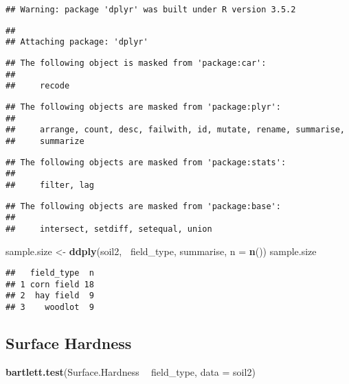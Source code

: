 \documentclass[]{article}
\newenvironment{Shaded}{\begin{snugshade}}{\end{snugshade}}
\newcommand{\KeywordTok}[1]{\textcolor[rgb]{0.13,0.29,0.53}{\textbf{#1}}}
\newcommand{\DataTypeTok}[1]{\textcolor[rgb]{0.13,0.29,0.53}{#1}}
\newcommand{\StringTok}[1]{\textcolor[rgb]{0.31,0.60,0.02}{#1}}
\newcommand{\OperatorTok}[1]{\textcolor[rgb]{0.81,0.36,0.00}{\textbf{#1}}}
\newcommand{\NormalTok}[1]{#1}
\begin{document}
\begin{verbatim}
## Warning: package 'dplyr' was built under R version 3.5.2
\end{verbatim}

\begin{verbatim}
## 
## Attaching package: 'dplyr'
\end{verbatim}

\begin{verbatim}
## The following object is masked from 'package:car':
## 
##     recode
\end{verbatim}

\begin{verbatim}
## The following objects are masked from 'package:plyr':
## 
##     arrange, count, desc, failwith, id, mutate, rename, summarise,
##     summarize
\end{verbatim}

\begin{verbatim}
## The following objects are masked from 'package:stats':
## 
##     filter, lag
\end{verbatim}

\begin{verbatim}
## The following objects are masked from 'package:base':
## 
##     intersect, setdiff, setequal, union
\end{verbatim}

\begin{Shaded}
\begin{Highlighting}[]
\NormalTok{sample.size <-}\StringTok{ }\KeywordTok{ddply}\NormalTok{(soil2, }\OperatorTok{~}\NormalTok{field_type, summarise, }\DataTypeTok{n =} \KeywordTok{n}\NormalTok{())}
\NormalTok{sample.size}
\end{Highlighting}
\end{Shaded}

\begin{verbatim}
##   field_type  n
## 1 corn field 18
## 2  hay field  9
## 3    woodlot  9
\end{verbatim}

\subsection{Surface Hardness}\label{surface-hardness}

\begin{Shaded}
\begin{Highlighting}[]
\KeywordTok{bartlett.test}\NormalTok{(Surface.Hardness }\OperatorTok{~}\StringTok{ }\NormalTok{field_type, }\DataTypeTok{data =}\NormalTok{ soil2)}
\end{Highlighting}
\end{Shaded}
\end{document}
